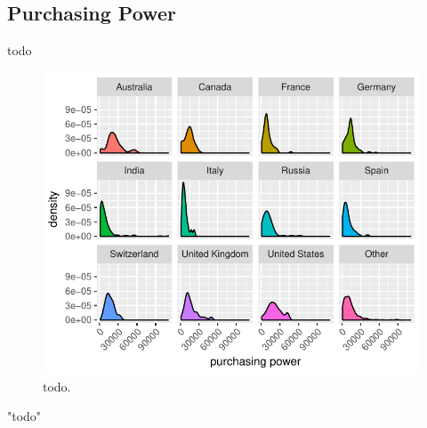 \documentclass{article}
\begin{document}
% 
% 
% 
% 
% 

\subsection{Purchasing Power}
todo


\begin{figure}[H]
\centering
\includegraphics{report-007}
\caption{todo.}\label{fig_5}
\end{figure}



\begin{Schunk}
\begin{Soutput}
[1] "todo"
\end{Soutput}
\end{Schunk}
\end{document}
